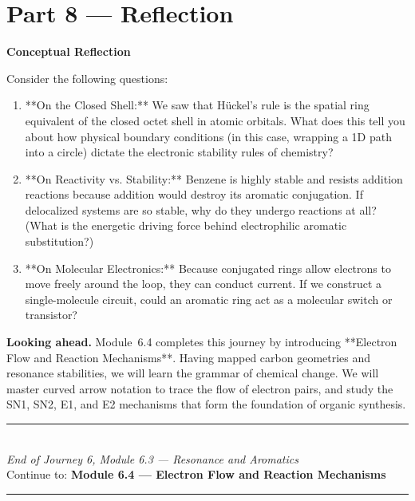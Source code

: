 \documentclass[12pt, a4paper]{book}
\begin{document}
\newpage

\section{Part 8 --- Reflection}

\begin{reflectionbox}
\textbf{Conceptual Reflection}

Consider the following questions:
\begin{enumerate}
  \item **On the Closed Shell:** We saw that Hückel's rule is the spatial ring equivalent of the closed octet shell in atomic orbitals. What does this tell you about how physical boundary conditions (in this case, wrapping a 1D path into a circle) dictate the electronic stability rules of chemistry?
  \item **On Reactivity vs. Stability:** Benzene is highly stable and resists addition reactions because addition would destroy its aromatic conjugation. If delocalized systems are so stable, why do they undergo reactions at all? (What is the energetic driving force behind electrophilic aromatic substitution?)
  \item **On Molecular Electronics:** Because conjugated rings allow electrons to move freely around the loop, they can conduct current. If we construct a single-molecule circuit, could an aromatic ring act as a molecular switch or transistor?
\end{enumerate}
\end{reflectionbox}

\medskip
\noindent\textbf{Looking ahead.}
Module~6.4 completes this journey by introducing **Electron Flow and Reaction Mechanisms**. Having mapped carbon geometries and resonance stabilities, we will learn the grammar of chemical change. We will master curved arrow notation to trace the flow of electron pairs, and study the SN1, SN2, E1, and E2 mechanisms that form the foundation of organic synthesis.

\vspace{1.4cm}
\begin{center}
{\color{JourneyColor}\rule{0.5\linewidth}{0.8pt}}\\[6pt]
{\small\color{JourneyColor}\textit{End of Journey 6, Module 6.3 --- Resonance and Aromatics}}\\[4pt]
{\small\color{JourneyColor}Continue to: \textbf{Module 6.4 --- Electron Flow and Reaction Mechanisms}}\\[6pt]
{\color{JourneyColor}\rule{0.5\linewidth}{0.8pt}}
\end{center}
\end{document}
